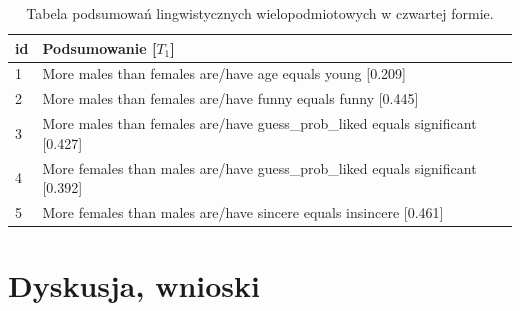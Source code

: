 \documentclass{classrep}
\begin{document}
\begin{center}
  \begin{table}[H]
    \begin{tabularx}{\textwidth}{lXc}
    
    id & Podsumowanie [$T_1$] \\ \hline 
  
    1 & More males than females are/have age equals young [0.209] \\\hline
    2 & More males than females are/have funny equals funny [0.445] \\  \hline
    3 & More males than females are/have guess\_prob\_liked equals significant [0.427]\\ \hline
    4 & More females than males are/have guess\_prob\_liked equals significant [0.392]\\ \hline
    5 & More females than males are/have sincere equals insincere [0.461]\\ \hline
  \end{tabularx}
  \caption{Tabela podsumowań lingwistycznych wielopodmiotowych w czwartej formie.}
\end{table}
\end{center}





% 
% 
% 

\section{Dyskusja, wnioski}
\end{document}
